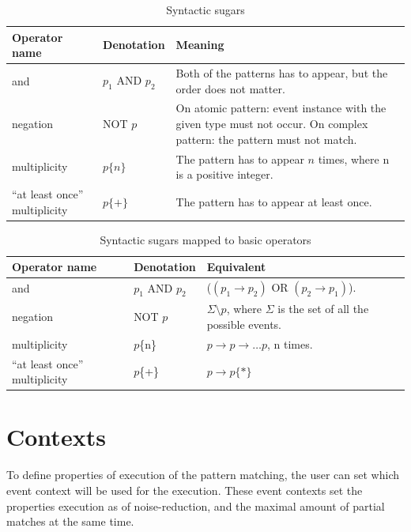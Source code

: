 \begin{table}
	\caption{Syntactic sugars}		
	\label{tab:cep:veplsugar}
	\begin{tabularx}{\textwidth}{llX}
		\toprule
		Operator name &	Denotation & Meaning \\
		\midrule
		and & $p_1$ AND $p_2$ & Both of the patterns has to appear, but the order does not matter.\\
		negation & NOT $p$ & On atomic pattern: event instance with the given type must not occur. On complex pattern: the pattern must not match. \\
		multiplicity & $p\{n\}$ & The pattern has to appear $n$ times, where n is a positive integer.\\
		``at least once'' multiplicity & $p\{+\}$ & The pattern has to appear at least once. \\
		\bottomrule
	\end{tabularx}
\end{table}

\begin{table}
	\caption{Syntactic sugars mapped to basic operators}		
	\label{tab:cep:veplsugartobasic}
	\begin{tabularx}{\textwidth}{llX}
		\toprule
		Operator name & Denotation & Equivalent \\
		\midrule
		and & $p_1$ AND $p_2$ & ($(p_1 \rightarrow p_2)$ OR $(p_2 \rightarrow p_1)$). \\
		negation & NOT $p$ & $\Sigma \setminus p$, where $\Sigma$ is the set of all the possible events. \mytodo{And complex NEG?} \\
		multiplicity & $p$\{n\} & $p \rightarrow p \rightarrow \dots p$, n times. \\
		``at least once'' multiplicity & $p$\{+\} & $p \rightarrow p\{\ast\}$ \\
		\bottomrule
	\end{tabularx}
\end{table}

\needspace{5cm}
\section{Contexts}

To define properties of execution of the pattern matching, the user can set which event context will be used for the execution.
These event contexts set the properties execution as of noise-reduction, and the maximal amount of partial matches at the same time.

